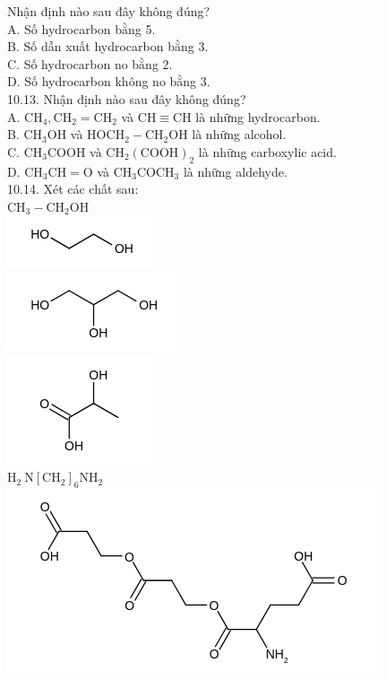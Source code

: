 \documentclass[10pt]{article}
\begin{document}
Nhận định nào sau đây không đúng?\\
A. Số hydrocarbon bằng 5.\\
B. Số dẫn xuất hydrocarbon bằng 3.\\
C. Số hydrocarbon no bằng 2.\\
D. Số hydrocarbon không no bằng 3.\\
10.13. Nhận định nào sau đây không đúng?\\
A. $\mathrm{CH}_{4}, \mathrm{CH}_{2}=\mathrm{CH}_{2}$ và $\mathrm{CH} \equiv \mathrm{CH}$ là những hydrocarbon.\\
B. $\mathrm{CH}_{3} \mathrm{OH}$ và $\mathrm{HOCH}_{2}-\mathrm{CH}_{2} \mathrm{OH}$ là những alcohol.\\
C. $\mathrm{CH}_{3} \mathrm{COOH}$ và $\mathrm{CH}_{2}(\mathrm{COOH})_{2}$ là những carboxylic acid.\\
D. $\mathrm{CH}_{3} \mathrm{CH}=\mathrm{O}$ và $\mathrm{CH}_{3} \mathrm{COCH}_{3}$ là những aldehyde.\\
10.14. Xét các chất sau:\\
$\mathrm{CH}_{3}-\mathrm{CH}_{2} \mathrm{OH}$\\
\includegraphics{smile-b319609c369ffca781d62511cb1af7a8bc77665b}\\
\includegraphics{smile-29762c2e04eaad242d4630a877781dad4a9e3bf2}\\
\includegraphics{smile-2d8898704cc6cc0bd550331db26da624713c28a5}\\
$\mathrm{H}_{2} \mathrm{~N}\left[\mathrm{CH}_{2}\right]_{6} \mathrm{NH}_{2}$\\
\includegraphics{smile-73e8d11180c54980c0c6a4fd46db08211bea6e00}
\end{document}
